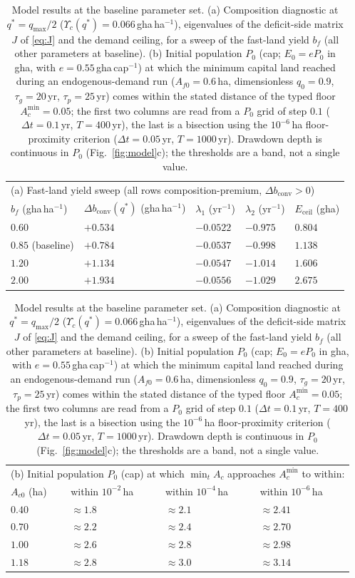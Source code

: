 \documentclass[preprint,12pt,authoryear]{elsarticle}
\newcommand{\dconv}{\Delta b_{\mathrm{conv}}}
\newcommand{\Ups}{\Upsilon_c}
\newcommand{\Eceil}{E_{\mathrm{ceil}}}
\newcommand{\Acmin}{A_c^{\min}}
\begin{document}
\begin{table}[!htbp]
\centering\small
\caption{Model results at the baseline parameter set. (a) Composition diagnostic at $q^*=q_{\max}/2$ ($\Ups(q^*)=0.066$\,gha\,ha$^{-1}$), eigenvalues of the deficit-side matrix $J$ of \eqref{eq:J} and the demand ceiling, for a sweep of the fast-land yield $b_f$ (all other parameters at baseline). (b) Initial population $P_0$ (cap; $E_0=eP_0$ in gha, with $e=0.55$\,gha\,cap$^{-1}$) at which the minimum capital land reached during an endogenous-demand run ($A_{f0}=0.6$\,ha, dimensionless $q_0=0.9$, $\tau_g=20$\,yr, $\tau_p=25$\,yr) comes within the stated distance of the typed floor $\Acmin=0.05$; the first two columns are read from a $P_0$ grid of step $0.1$ ($\Delta t=0.1$\,yr, $T=400$\,yr), the last is a bisection using the $10^{-6}$\,ha floor-proximity criterion ($\Delta t=0.05$\,yr, $T=1000$\,yr). Drawdown depth is continuous in $P_0$ (Fig.~\ref{fig:model}c); the thresholds are a band, not a single value.}
\label{tab:model}
\begin{tabular}{l l l l l}
\toprule
\multicolumn{5}{l}{(a) Fast-land yield sweep (all rows composition-premium, $\dconv>0$)}\\
$b_f$ (gha\,ha$^{-1}$) & $\dconv(q^*)$ (gha\,ha$^{-1}$) & $\lambda_1$ (yr$^{-1}$) & $\lambda_2$ (yr$^{-1}$) & $\Eceil$ (gha) \\
\midrule
$0.60$ & $+0.534$ & $-0.0522$ & $-0.975$ & $0.804$ \\
$0.85$ (baseline) & $+0.784$ & $-0.0537$ & $-0.998$ & $1.138$ \\
$1.20$ & $+1.134$ & $-0.0547$ & $-1.014$ & $1.606$ \\
$2.00$ & $+1.934$ & $-0.0556$ & $-1.029$ & $2.675$ \\
\bottomrule
\end{tabular}

\medskip
\begin{tabular}{l l l l}
\toprule
\multicolumn{4}{l}{(b) Initial population $P_0$ (cap) at which $\min_tA_c$ approaches $\Acmin$ to within:}\\ 
$A_{c0}$ (ha) & within $10^{-2}$\,ha & within $10^{-4}$\,ha & within $10^{-6}$\,ha \\
\midrule
$0.40$ & $\approx1.8$ & $\approx2.1$ & $\approx2.41$ \\
$0.70$ & $\approx2.2$ & $\approx2.4$ & $\approx2.70$ \\
$1.00$ & $\approx2.6$ & $\approx2.8$ & $\approx2.98$ \\
$1.18$ & $\approx2.8$ & $\approx3.0$ & $\approx3.14$ \\
\bottomrule
\end{tabular}
\end{table}
\end{document}

